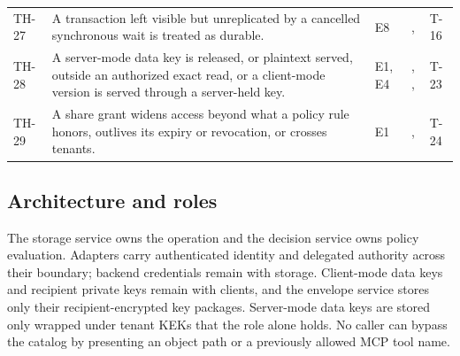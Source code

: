 \begin{longtable}{@{}P{0.07\textwidth}P{0.34\textwidth}P{0.08\textwidth}P{0.29\textwidth}P{0.12\textwidth}@{}}
TH-27 & A transaction left visible but unreplicated by a cancelled synchronous wait is treated as durable. & E8 & ,  & T-16\\
TH-28 & A server-mode data key is released, or plaintext served, outside an authorized exact read, or a client-mode version is served through a server-held key. & E1, E4 & , ,  & T-23\\
TH-29 & A share grant widens access beyond what a policy rule honors, outlives its expiry or revocation, or crosses tenants. & E1 & ,  & T-24\\
\bottomrule
\end{longtable}

\subsection{Architecture and roles}\label{sec:arch}
The storage service owns the operation and the decision service owns policy evaluation. Adapters carry authenticated identity and delegated authority across their boundary; backend credentials remain with storage. Client-mode data keys and recipient private keys remain with clients, and the envelope service stores only their recipient-encrypted key packages. Server-mode data keys are stored only wrapped under tenant KEKs that the  role alone holds. No caller can bypass the catalog by presenting an object path or a previously allowed MCP tool name.

